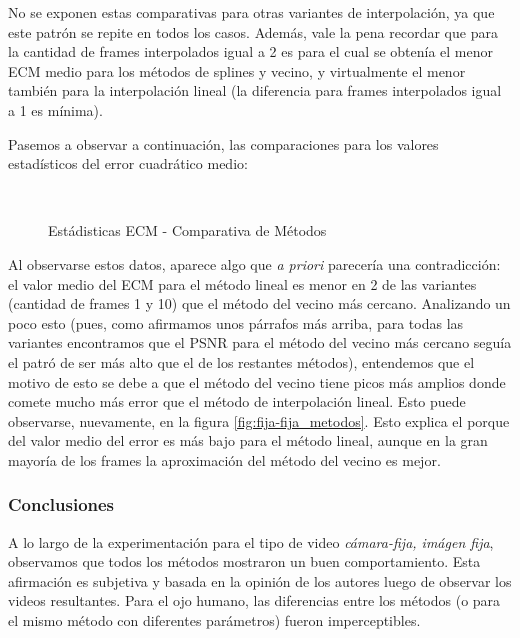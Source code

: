 \par No se exponen estas comparativas para otras variantes de interpolaci\'on,
ya que este patr\'on se repite en todos los casos. Adem\'as, vale la pena
recordar que para la cantidad de frames interpolados igual a 2 es para el cual
se obten\'ia el menor ECM medio para los m\'etodos de splines y vecino, y
virtualmente el menor tambi\'en para la interpolaci\'on lineal (la diferencia
para frames interpolados igual a 1 es m\'inima).

\par Pasemos a observar a continuaci\'on, las comparaciones para los valores
estad\'isticos del error cuadr\'atico medio:

\begin{figure}[H]
    \centering
    \\
    \caption{Est\'adisticas ECM - Comparativa de M\'etodos}
    \label{fig:fija-fija_methods-mse_estadisticas}
\end{figure}

\par Al observarse estos datos, aparece algo que \emph{a priori} parecer\'ia
una contradicci\'on: el valor medio del ECM para el m\'etodo lineal es menor en
2 de las variantes (cantidad de frames 1 y 10) que el m\'etodo del vecino m\'as
cercano. Analizando un poco esto (pues, como afirmamos unos p\'arrafos m\'as
arriba, para todas las variantes encontramos que el PSNR para el m\'etodo del
vecino m\'as cercano segu\'ia el patr\'o de ser m\'as alto que el de los
restantes m\'etodos), entendemos que el motivo de esto se debe a que el
m\'etodo del vecino tiene picos m\'as amplios donde comete mucho m\'as error
que el m\'etodo de interpolaci\'on lineal. Esto puede observarse, nuevamente,
en la figura \ref{fig:fija-fija_metodos}.  Esto explica el porque del valor
medio del error es m\'as bajo para el m\'etodo lineal, aunque en la gran
mayor\'ia de los frames la aproximaci\'on del m\'etodo del vecino es mejor.

\subsubsection{Conclusiones}
\par A lo largo de la experimentaci\'on para el tipo de video
\emph{c\'amara-fija, im\'agen fija}, observamos que todos los m\'etodos
mostraron un buen comportamiento.  Esta afirmaci\'on es subjetiva y basada en
la opini\'on de los autores luego de observar los videos resultantes. Para el
ojo humano, las diferencias entre los m\'etodos (o para el mismo m\'etodo con
diferentes par\'ametros) fueron imperceptibles.

